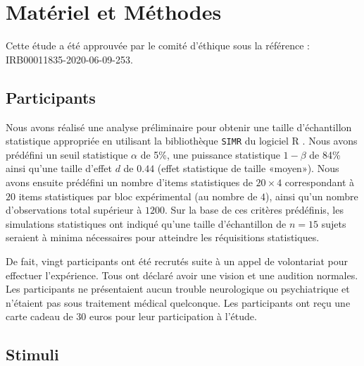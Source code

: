 \section{Matériel et Méthodes}
\label{etude2materielmethode}

Cette étude a été approuvée par le comité d'éthique sous la référence : IRB00011835-2020-06-09-253. 

\subsection{Participants}
\label{etude2participants}

Nous avons réalisé une analyse préliminaire pour obtenir une taille d'échantillon statistique appropriée en utilisant la bibliothèque \texttt{SIMR} du logiciel R \citep{Rlanguage2021}.
Nous avons prédéfini un seuil statistique $\alpha$ de 5\%, une puissance statistique $1-\beta$ de 84\% ainsi qu'une taille d'effet $d$ de $0.44$ (effet statistique de taille «moyen»). 
Nous avons ensuite prédéfini un nombre d'items statistiques de $20\times4$ correspondant à $20$ items statistiques par bloc expérimental (au nombre de $4$), ainsi qu'un nombre d'observations total supérieur à $1200$. 
Sur la base de ces critères prédéfinis, les simulations statistiques ont indiqué qu'une taille d'échantillon de $n=15$ sujets seraient à minima nécessaires pour atteindre les réquisitions statistiques. 

De fait, vingt participants ont été recrutés suite à un appel de volontariat pour effectuer l'expérience. 
Tous ont déclaré avoir une vision et une audition normales. 
Les participants ne présentaient aucun trouble neurologique ou psychiatrique et n'étaient pas sous traitement médical quelconque. 
Les participants ont reçu une carte cadeau de $30$ euros pour leur participation à l'étude. 

\subsection{Stimuli}
\label{etude2stimuli}

